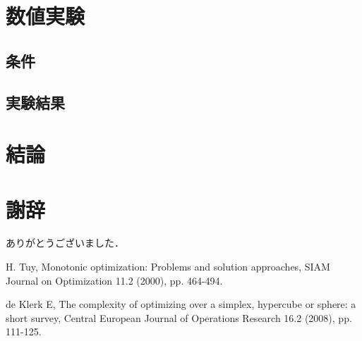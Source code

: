 \documentclass[a4paper,11pt]{jreport}
\begin{document}
\chapter{数値実験}
\section{条件}
\section{実験結果}

\chapter{結論}

\chapter*{謝辞}

ありがとうございました．

\newpage

\renewcommand{\bibname}{参考文献}

\begin{thebibliography}{1}

H. Tuy,
\newblock Monotonic optimization: Problems and solution approaches,
\newblock SIAM Journal on Optimization 11.2 (2000), pp. 464-494.

de Klerk E,
\newblock The complexity of optimizing over a simplex, hypercube or sphere: a short survey,
\newblock Central European Journal of Operations Research 16.2 (2008), pp. 111-125.

\end{thebibliography}
\end{document}

